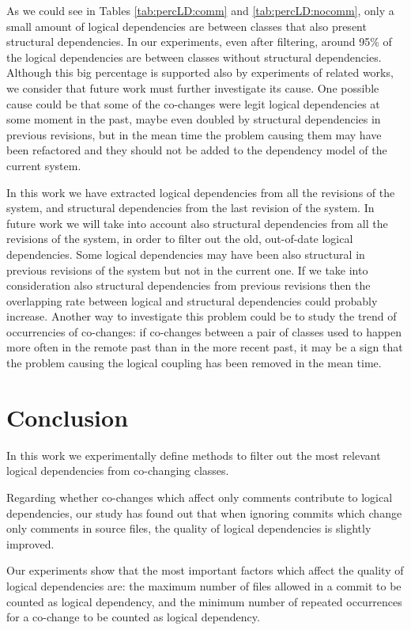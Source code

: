\documentclass[a4paper,twoside]{article}
\begin{document}
As we could see in Tables \ref{tab:percLD:comm} and \ref{tab:percLD:nocomm}, only a small amount of logical dependencies are between classes that also present structural dependencies.  In our experiments, even after filtering, around 95\% of the logical dependencies are between classes without structural dependencies. Although this big percentage is supported also by experiments of related works, we consider that future work must further investigate its cause. One possible cause could be that some of the co-changes were legit logical dependencies at some moment in the past, maybe even doubled by structural dependencies in previous revisions, but in the mean time the problem causing them may have been refactored and they should not be added to the dependency model of the current system.  

In this work we have extracted logical dependencies from all the revisions of the system, and structural dependencies from the last revision of the system. In future work we will take into account also structural dependencies from all the revisions of the system, in order to filter out the old, out-of-date logical dependencies.  Some logical dependencies may have been also structural in previous revisions of the system but not in the current one. If we take into consideration also structural dependencies from previous revisions then the overlapping rate between logical and structural dependencies could probably increase. Another way to investigate this problem could be to study the trend of occurrencies of co-changes: if co-changes between a pair of classes used to happen more often in the remote past than in the more recent past, it may be a sign that the problem causing the logical coupling has been removed in the mean time. 


   


\section{Conclusion}
\label{sec:Conclusion}
   
In this work we experimentally define methods to filter out the most relevant logical dependencies from co-changing classes. 

Regarding whether co-changes which affect only comments contribute to logical dependencies, our study has found out that when ignoring commits which change only comments in source files, the quality of logical dependencies is slightly improved.

Our experiments show that the most important factors which affect the quality of logical dependencies are: the maximum number of files allowed in a commit to be counted as logical dependency, and the minimum number of repeated occurrences for a co-change to be counted as logical dependency. 


 

{\small
}
 
\end{document}

